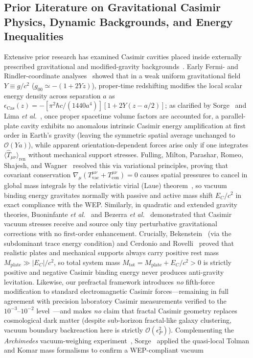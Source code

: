 \documentclass[aps,prd,twocolumn,10pt,showkeys,nofootinbib,floatfix,longbibliography]{revtex4-2}
\begin{document}
\subsection{Prior Literature on Gravitational Casimir Physics, Dynamic Backgrounds, and Energy Inequalities}
Extensive prior research has examined Casimir cavities placed inside externally prescribed gravitational and modified-gravity backgrounds~\cite{buoninfante2019epjc,bezerra2024physics}. Early Fermi- and Rindler-coordinate analyses~\cite{sorge2005,bimonte2006,bimonte2007prd} showed that in a weak uniform gravitational field $Y \equiv g/c^2$ ($g_{00} \simeq -(1 + 2Yz)$), proper-time redshifting modifies the local scalar energy density across separation $a$ as $\epsilon_{\mathrm{Cas}}(z) = -[\pi^2\hbar c/(1440 a^4)][1 + 2Y(z - a/2)]$; as clarified by Sorge~\cite{sorge2005,sorge2019schwinger} and Lima \emph{et al.}~\cite{lima2019jcap,lima2021jcap}, once proper spacetime volume factors are accounted for, a parallel-plate cavity exhibits no anomalous intrinsic Casimir energy amplification at first order in Earth's gravity (leaving the symmetric spatial average unchanged to $\mathcal{O}(Ya)$), while apparent orientation-dependent forces arise only if one integrates $\langle \hat{T}_{\mu\nu}\rangle_{\mathrm{ren}}$ without mechanical support stresses. Fulling, Milton, Parashar, Romeo, Shajesh, and Wagner~\cite{fulling2007,milton2014fall} resolved this via variational principles, proving that covariant conservation $\nabla_\mu(T^{\mu\nu}_{\mathrm{vac}} + T^{\mu\nu}_{\mathrm{con}}) = 0$ causes spatial pressures to cancel in global mass integrals by the relativistic virial (Laue) theorem~\cite{laue1911annphys}, so vacuum binding energy gravitates normally with passive and active mass shift $E_C/c^2$ in exact compliance with the WEP. Similarly, in quadratic and extended gravity theories, Buoninfante \emph{et al.}~\cite{buoninfante2019epjc} and Bezerra \emph{et al.}~\cite{bezerra2024physics} demonstrated that Casimir vacuum stresses receive and source only tiny perturbative gravitational corrections with no first-order enhancement. Crucially, Bekenstein~\cite{bekenstein2013prd} (via the subdominant trace energy condition) and Cerdonio and Rovelli~\cite{cerdonio2015fly,cerdonio2015ijmpd} proved that realistic plates and mechanical supports always carry positive rest mass $M_{\mathrm{plate}} \gg |E_C|/c^2$, so total system mass $M_{\mathrm{tot}} = M_{\mathrm{plate}} + E_C/c^2 > 0$ is strictly positive and negative Casimir binding energy never produces anti-gravity levitation. Likewise, our prefractal framework introduces \emph{no} fifth-force modification to standard electromagnetic Casimir forces---remaining in full agreement with precision laboratory Casimir measurements verified to the $10^{-3}\text{--}10^{-2}$ level~\cite{klimchitskaya2009rmp}---and makes \emph{no} claim that fractal Casimir geometry replaces cosmological dark matter (despite sub-horizon fractal-like galaxy clustering, vacuum boundary backreaction here is strictly $\mathcal{O}(\epsilon_P^2)$). Complementing the \emph{Archimedes} vacuum-weighing experiment~\cite{calloni2014,calloni2016nima}, Sorge~\cite{sorge2021buoyancy} applied the quasi-local Tolman and Komar mass formalisms to confirm a WEP-compliant vacuum 
\end{document}
